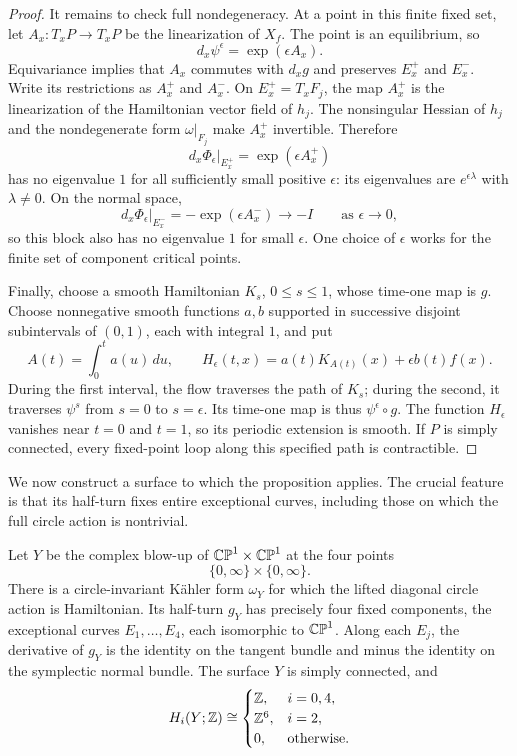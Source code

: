\begin{proof}
It remains to check full nondegeneracy.  At a point in this finite fixed
set, let $A_x:T_xP\to T_xP$ be the linearization of $X_f$.  The point is an
equilibrium, so
\[
  d_x\psi^\epsilon=\exp(\epsilon A_x).
\]
Equivariance implies that $A_x$ commutes with $d_xg$ and preserves $E_x^+$
and $E_x^-$.  Write its restrictions as $A_x^+$ and $A_x^-$.  On
$E_x^+=T_xF_j$, the map $A_x^+$ is the linearization of the Hamiltonian
vector field of $h_j$.  The nonsingular Hessian of $h_j$ and the
nondegenerate form $\omega|_{F_j}$ make $A_x^+$ invertible.  Therefore
\[
  d_x\Phi_\epsilon|_{E_x^+}=\exp(\epsilon A_x^+)
\]
has no eigenvalue $1$ for all sufficiently small positive $\epsilon$:
its eigenvalues are $e^{\epsilon\lambda}$ with $\lambda\ne0$.  On the normal
space,
\[
  d_x\Phi_\epsilon|_{E_x^-}=-\exp(\epsilon A_x^-)
      \longrightarrow -I
      \qquad\text{as }\epsilon\longrightarrow0,
\]
so this block also has no eigenvalue $1$ for small $\epsilon$.  One choice
of $\epsilon$ works for the finite set of component critical points.

Finally, choose a smooth Hamiltonian $K_s$, $0\le s\le1$, whose time-one
map is $g$.  Choose nonnegative smooth functions $a,b$ supported in
successive disjoint subintervals of $(0,1)$, each with integral $1$, and
put
\[
  A(t)=\int_0^t a(u)\,du,
  \qquad
  H_\epsilon(t,x)=a(t)K_{A(t)}(x)+\epsilon b(t)f(x).
\]
During the first interval, the flow traverses the path of $K_s$; during
the second, it traverses $\psi^s$ from $s=0$ to $s=\epsilon$.  Its time-one
map is thus $\psi^\epsilon\circ g$.  The function $H_\epsilon$ vanishes near
$t=0$ and $t=1$, so its periodic extension is smooth.  If $P$ is simply
connected, every fixed-point loop along this specified path is
contractible.
\end{proof}

We now construct a surface to which the proposition applies.  The crucial
feature is that its half-turn fixes entire exceptional curves, including
those on which the full circle action is nontrivial.

\begin{proposition}\label{prop:surface}
Let $Y$ be the complex blow-up of $\mathbb{CP}^1\times\mathbb{CP}^1$ at the four points
\[
  \{0,\infty\}\times\{0,\infty\}.
\]
There is a circle-invariant K\"ahler form $\omega_Y$ for which the lifted
diagonal circle action is Hamiltonian.  Its half-turn $g_Y$ has precisely
four fixed components, the exceptional curves $E_1,\ldots,E_4$, each
isomorphic to $\mathbb{CP}^1$.  Along each $E_j$, the derivative of $g_Y$ is the
identity on the tangent bundle and minus the identity on the symplectic
normal bundle.  The surface $Y$ is simply connected, and
\begin{equation}\label{eq:Y-homology}
  H_i(Y;\mathbb Z)\cong
  \begin{cases}
    \mathbb Z,&i=0,4,\\
    \mathbb Z^6,&i=2,\\
    0,&\text{otherwise}.
  \end{cases}
\end{equation}
\end{proposition}

